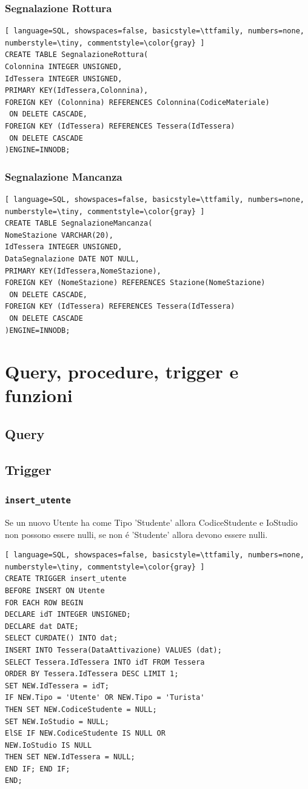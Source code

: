 \documentclass[a4paper,twoside]{article}
\begin{document}
\subsubsection{Segnalazione Rottura}
\begin{lstlisting}[ language=SQL, showspaces=false, basicstyle=\ttfamily, numbers=none, numberstyle=\tiny, commentstyle=\color{gray} ]
CREATE TABLE SegnalazioneRottura(
Colonnina INTEGER UNSIGNED,
IdTessera INTEGER UNSIGNED,
PRIMARY KEY(IdTessera,Colonnina),
FOREIGN KEY (Colonnina) REFERENCES Colonnina(CodiceMateriale)
 ON DELETE CASCADE,
FOREIGN KEY (IdTessera) REFERENCES Tessera(IdTessera)
 ON DELETE CASCADE
)ENGINE=INNODB;
\end{lstlisting}
\subsubsection{Segnalazione Mancanza}
\begin{lstlisting}[ language=SQL, showspaces=false, basicstyle=\ttfamily, numbers=none, numberstyle=\tiny, commentstyle=\color{gray} ]
CREATE TABLE SegnalazioneMancanza(
NomeStazione VARCHAR(20),
IdTessera INTEGER UNSIGNED,
DataSegnalazione DATE NOT NULL,
PRIMARY KEY(IdTessera,NomeStazione),
FOREIGN KEY (NomeStazione) REFERENCES Stazione(NomeStazione)
 ON DELETE CASCADE,
FOREIGN KEY (IdTessera) REFERENCES Tessera(IdTessera)
 ON DELETE CASCADE
)ENGINE=INNODB;
\end{lstlisting}
\section{Query, procedure, trigger e funzioni}
\subsection{Query}
\subsection{Trigger}
\subsubsection{\texttt{insert\_utente}}
Se un nuovo Utente ha come Tipo 'Studente' allora CodiceStudente e IoStudio non possono essere nulli, se non é 'Studente' allora devono essere nulli.
\begin{lstlisting}[ language=SQL, showspaces=false, basicstyle=\ttfamily, numbers=none, numberstyle=\tiny, commentstyle=\color{gray} ]
CREATE TRIGGER insert_utente
BEFORE INSERT ON Utente
FOR EACH ROW BEGIN
DECLARE idT INTEGER UNSIGNED;
DECLARE dat DATE;
SELECT CURDATE() INTO dat;
INSERT INTO Tessera(DataAttivazione) VALUES (dat);
SELECT Tessera.IdTessera INTO idT FROM Tessera
ORDER BY Tessera.IdTessera DESC LIMIT 1;
SET NEW.IdTessera = idT;
IF NEW.Tipo = 'Utente' OR NEW.Tipo = 'Turista'
THEN SET NEW.CodiceStudente = NULL;
SET NEW.IoStudio = NULL;
ElSE IF NEW.CodiceStudente IS NULL OR
NEW.IoStudio IS NULL
THEN SET NEW.IdTessera = NULL;
END IF; END IF;
END;
\end{lstlisting}
\end{document}
